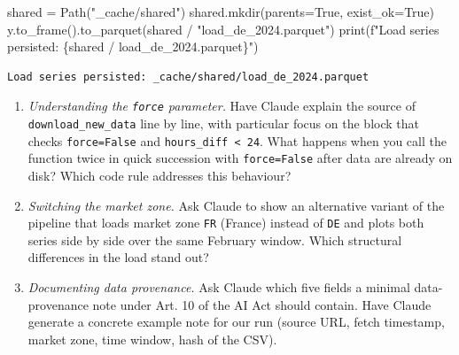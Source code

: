 \documentclass[
  english,
  letterpaper,
]{scrbook}
\newenvironment{Shaded}{\begin{snugshade}}{\end{snugshade}}
\newcommand{\BuiltInTok}[1]{\textcolor[rgb]{0.00,0.23,0.31}{#1}}
\newcommand{\NormalTok}[1]{\textcolor[rgb]{0.00,0.23,0.31}{#1}}
\newcommand{\OperatorTok}[1]{\textcolor[rgb]{0.37,0.37,0.37}{#1}}
\newcommand{\SpecialCharTok}[1]{\textcolor[rgb]{0.37,0.37,0.37}{#1}}
\newcommand{\SpecialStringTok}[1]{\textcolor[rgb]{0.13,0.47,0.30}{#1}}
\newcommand{\StringTok}[1]{\textcolor[rgb]{0.13,0.47,0.30}{#1}}
\newcommand{\VariableTok}[1]{\textcolor[rgb]{0.07,0.07,0.07}{#1}}
\providecommand{\tightlist}{%
  \setlength{\itemsep}{0pt}\setlength{\parskip}{0pt}}
\begin{document}
\protect{}\label{persist-load}
\begin{Shaded}
\begin{Highlighting}[]
\NormalTok{shared }\OperatorTok{=}\NormalTok{ Path(}\StringTok{"\_cache/shared"}\NormalTok{)}
\NormalTok{shared.mkdir(parents}\OperatorTok{=}\VariableTok{True}\NormalTok{, exist\_ok}\OperatorTok{=}\VariableTok{True}\NormalTok{)}
\NormalTok{y.to\_frame().to\_parquet(shared }\OperatorTok{/} \StringTok{"load\_de\_2024.parquet"}\NormalTok{)}
\BuiltInTok{print}\NormalTok{(}\SpecialStringTok{f"Load series persisted: }\SpecialCharTok{\{}\NormalTok{shared }\OperatorTok{/} \StringTok{\textquotesingle{}load\_de\_2024.parquet\textquotesingle{}}\SpecialCharTok{\}}\SpecialStringTok{"}\NormalTok{)}
\end{Highlighting}
\end{Shaded}

\begin{verbatim}
Load series persisted: _cache/shared/load_de_2024.parquet
\end{verbatim}

\begin{tcolorbox}[enhanced jigsaw, arc=.35mm, bottomrule=.15mm, bottomtitle=1mm, breakable, colback=white, colbacktitle=quarto-callout-tip-color!10!white, colframe=quarto-callout-tip-color-frame, coltitle=black, left=2mm, leftrule=.75mm, opacityback=0, opacitybacktitle=0.6, rightrule=.15mm, title=\textcolor{quarto-callout-tip-color}{\faLightbulb}\hspace{0.5em}{Exercises (with Claude)}, titlerule=0mm, toprule=.15mm, toptitle=1mm]

\begin{enumerate}
\def\labelenumi{\arabic{enumi}.}
\tightlist
\item
  \emph{Understanding the \texttt{force} parameter.} Have Claude explain
  the source of \texttt{download\_new\_data} line by line, with
  particular focus on the block that checks \texttt{force=False} and
  \texttt{hours\_diff\ \textless{}\ 24}. What happens when you call the
  function twice in quick succession with \texttt{force=False} after
  data are already on disk? Which code rule addresses this behaviour?
\item
  \emph{Switching the market zone.} Ask Claude to show an alternative
  variant of the pipeline that loads market zone \texttt{FR} (France)
  instead of \texttt{DE} and plots both series side by side over the
  same February window. Which structural differences in the load stand
  out?
\item
  \emph{Documenting data provenance.} Ask Claude which five fields a
  minimal data-provenance note under Art. 10 of the AI Act should
  contain. Have Claude generate a concrete example note for our run
  (source URL, fetch timestamp, market zone, time window, hash of the
  CSV).
\end{enumerate}

\end{tcolorbox}
\end{document}
